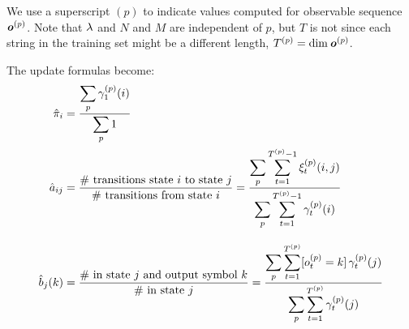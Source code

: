 We use a superscript $(p)$ to indicate values computed for observable
sequence $\boldsymbol{\mathit{o}}^{(p)}$.  Note that $\lambda$ and $N$ and $M$ are
independent of $p$, but $T$ is not since each string in the training
set might be a different length, $T^{(p)} = \dim \boldsymbol{\mathit{o}}^{(p)}$.

The update formulas become:
\begin{subequations}
\begin{align}
  \hat{\pi}_i &= \frac{\displaystyle\sum_p \gamma^{(p)}_1(i)}{\displaystyle\sum_p 1}
  \\
  \hat{a}_{ij} &= \frac{\text{\# transitions state $i$ to state $j$}}
		       {\text{\# transitions from state $i$}}
  = \frac{\displaystyle\sum_p \displaystyle\sum_{t=1}^{T^{(p)}-1}  \xi^{(p)}_t(i,j)}
	 {\displaystyle\sum_p \displaystyle\sum_{t=1}^{T^{(p)}-1} \gamma^{(p)}_t(i)}
  \\[2ex]
  \hat{b}_j(k)
  &= \frac{\text{\# in state $j$ and output symbol $k$}}
	  {\text{\# in state $j$}}
  = \frac{\displaystyle\sum_p \displaystyle\sum_{t=1}^{T^{(p)}} [o^{(p)}_t=k] \, \gamma^{(p)}_t(j)}
	 {\displaystyle\sum_p \displaystyle\sum_{t=1}^{T^{(p)}} \gamma^{(p)}_t(j)}
\end{align}
\end{subequations}

